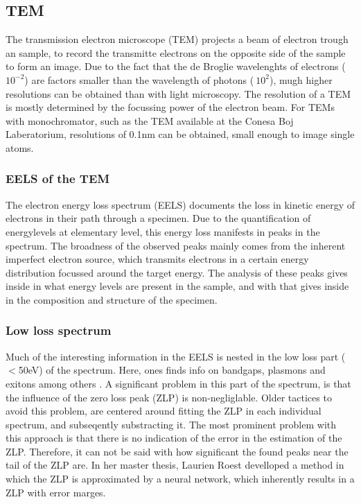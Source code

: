 \subsection{TEM} %
\label{ssub:tem}
The transmission electron microscope (TEM) projects a beam of electron trough an sample, to record the transmitte electrons on the opposite side of the sample to form an image. Due to the fact that the de Broglie wavelenghts of electrons (~$10^{-2}$) are factors smaller than the wavelength of photons ($~10^2$), mugh higher resolutions can be obtained than with light microscopy. \cite{reimer_1989} The resolution of a TEM is mostly determined by the focussing power of the electron beam. For TEMs with monochromator, such as the TEM available at the Conesa Boj Laberatorium, resolutions of 0.1nm can be obtained, small enough to image single atoms. \cite{egerton_article}




\subsubsection{EELS of the TEM}
The electron energy loss spectrum (EELS) documents the loss in kinetic energy of electrons in their path through a specimen. Due to the quantification of energylevels at elementary level, this energy loss manifests in peaks in the spectrum. The broadness of the observed peaks mainly comes from the inherent imperfect electron source, which transmits electrons in a certain energy distribution focussed around the target energy. The analysis of these peaks gives inside in what energy levels are present in the sample, and with that gives inside in the composition and structure of the specimen. \cite{egerton_article}




\subsubsection{Low loss spectrum}
Much of the interesting information in the EELS is nested in the low loss part ($<$50eV) of the spectrum. Here, ones finds info on bandgaps, plasmons and exitons among others \cite{egerton_book}. A significant problem in this part of the spectrum, is that the influence of the zero loss peak (ZLP) is non-negliglable. Older tactices to avoid this problem, are centered around fitting the ZLP in each individual spectrum, and subseqently substracting it. The most prominent problem with this approach is that there is no indication of the error in the estimation of the ZLP. Therefore, it can not be said with how significant the found peaks near the tail of the ZLP are. In her master thesis, Laurien Roest develloped a method in which the ZLP is approximated by a neural network, which inherently results in a ZLP with error marges. 

